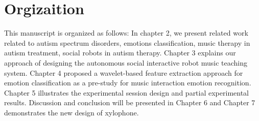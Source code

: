 \ei


\section{Orgizaition}
This manuscript is organized as follows: In chapter 2, we present related
work related to autism spectrum disorders, emotions classification, music
therapy in autism treatment, social robots in autism therapy. Chapter 3
explains our approach of designing the autonomous social interactive robot
music teaching system. Chapter 4 proposed a wavelet-based feature extraction
approach for emotion classification as a pre-study for music interaction
emotion recognition. Chapter 5 illustrates the experimental session design
and partial experimental results. Discussion and conclusion will be presented
in Chapter 6 and Chapter 7 demonstrates the new design of xylophone.
